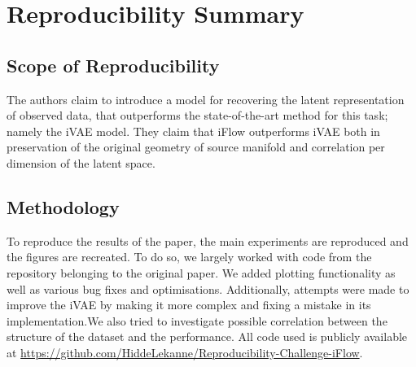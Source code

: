 \vspace{-3em}

\section*{\centering Reproducibility Summary}


\subsection*{Scope of Reproducibility}
The authors claim to introduce a model for recovering the latent representation of observed data, that outperforms the state-of-the-art method for this task; namely the iVAE model. They claim that iFlow outperforms iVAE both in preservation of the original geometry of source manifold and correlation per dimension of the latent space.

\subsection*{Methodology}
To reproduce the results of the paper, the main experiments are reproduced and the figures are recreated.
To do so, we largely worked with code from the repository belonging to the original paper. We added plotting functionality as well as various bug fixes and optimisations. Additionally, attempts were made to improve the iVAE by making it more complex and fixing a mistake in its implementation.We also tried to investigate possible correlation between the structure of the dataset and the performance. All code used is publicly available at \url{https://github.com/HiddeLekanne/Reproducibility-Challenge-iFlow}.

